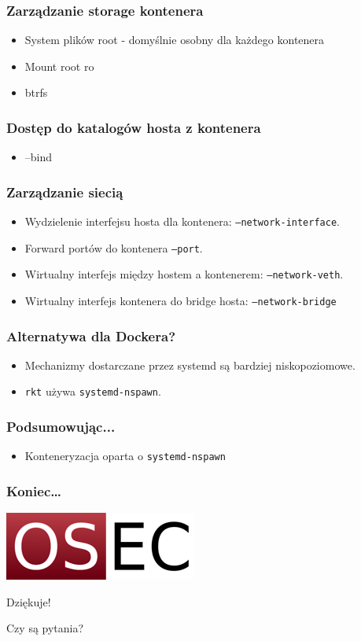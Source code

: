 \documentclass[dvipsnames,table]{beamer}
\begin{document}
\begin{frame}
\frametitle{Zarządzanie storage kontenera}
\begin{itemize}
	\item System plików root - domyślnie osobny dla każdego kontenera
	\item Mount root ro
	\item btrfs
\end{itemize}
\end{frame}

\begin{frame}
\frametitle{Dostęp do katalogów hosta z kontenera}
\begin{itemize}
	\item --bind
\end{itemize}
\end{frame}

\begin{frame}
\frametitle{Zarządzanie siecią}
\begin{itemize}
	\item Wydzielenie interfejsu hosta dla kontenera: {\tt --network-interface}.
	\item Forward portów do kontenera {\tt --port}.
	\item Wirtualny interfejs między hostem a kontenerem: {\tt --network-veth}.
	\item Wirtualny interfejs kontenera do bridge hosta: {\tt --network-bridge}
\end{itemize}
\end{frame}

\begin{frame}
\frametitle{Alternatywa dla Dockera?}
\begin{itemize}
	\item Mechanizmy dostarczane przez systemd są bardziej niskopoziomowe.
	\item {\tt rkt} używa {\tt systemd-nspawn}.
\end{itemize}	
\end{frame}

\begin{frame}
\frametitle{Podsumowując...}
\begin{itemize}
	\item Konteneryzacja oparta o {\tt systemd-nspawn} 
\end{itemize}
\end{frame}

\begin{frame}
\frametitle{Koniec\ldots}
\begin{center}
\includegraphics[scale=0.5]{img-oseclogo.png}

Dziękuje!

Czy są pytania?

\end{center}
\end{frame}
\end{document}
